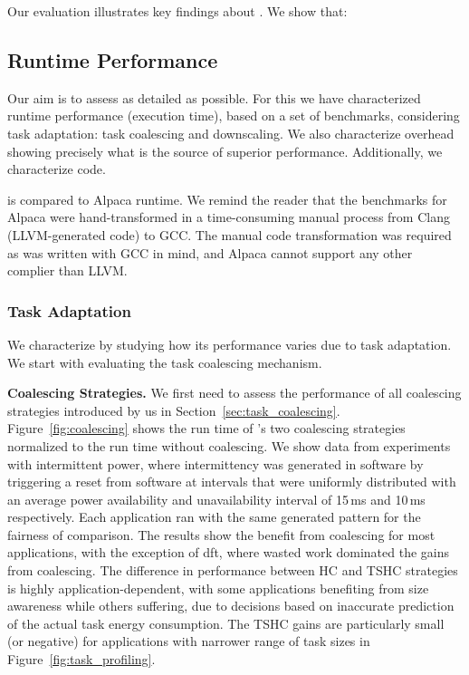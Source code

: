 Our evaluation illustrates key findings about \sys. We show that: 


\subsection{\sys Runtime Performance}
\label{sec:results_evaluation}

Our aim is to assess \sys as detailed as possible. For this we have characterized \sys runtime performance (execution time), based on a set of benchmarks, considering task adaptation: task coalescing and downscaling. We also characterize \sys overhead showing precisely what is the source of \sys superior performance. Additionally, we characterize \sys code. 

\sys is compared to Alpaca runtime. We remind the reader that the benchmarks for Alpaca were hand-transformed in a time-consuming manual process from Clang (LLVM-generated code) to GCC. The manual code transformation was required as \sys was written with GCC in mind, and Alpaca cannot support any other complier than LLVM.

\subsubsection{\sys Task Adaptation}
\label{sec:result_coalescing}

We characterize \sys by studying how its performance varies due to task adaptation. We start with evaluating the task coalescing mechanism.

\textbf{Coalescing Strategies.} We first need to assess the performance of all coalescing strategies introduced by us in Section~\ref{sec:task_coalescing}. Figure~\ref{fig:coalescing} shows the run time of \sys's two coalescing strategies normalized to the run time without coalescing. We show data from experiments with intermittent power, where intermittency was generated in software
by triggering a reset from software at intervals that were uniformly distributed with an average power availability and unavailability interval of 15\,ms and 10\,ms respectively. Each application ran with the same generated pattern for the fairness of comparison. The results show the benefit from coalescing for most applications, with the
exception of dft, where wasted work dominated the gains from coalescing.
The difference in performance between HC and TSHC strategies is highly
application-dependent, with some applications benefiting from size awareness
while others suffering, due to decisions based on inaccurate prediction of the
actual task energy consumption. The TSHC gains are particularly small (or negative) for applications with narrower range of task sizes in Figure~\ref{fig:task_profiling}.

